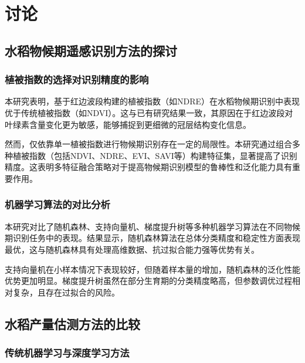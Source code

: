 
\chapter{讨论}
\label{chap:discussion}

\section{水稻物候期遥感识别方法的探讨}
\label{sec:discuss_phenology}

\subsection{植被指数的选择对识别精度的影响}
\label{subsec:vi_impact}

本研究表明，基于红边波段构建的植被指数（如NDRE）在水稻物候期识别中表现优于传统植被指数（如NDVI）。这与已有研究结果一致\cite{ref1}，其原因在于红边波段对叶绿素含量变化更为敏感，能够捕捉到更细微的冠层结构变化信息。

然而，仅依靠单一植被指数进行物候期识别存在一定的局限性。本研究通过组合多种植被指数（包括NDVI、NDRE、EVI、SAVI等）构建特征集，显著提高了识别精度。这表明多特征融合策略对于提高物候期识别模型的鲁棒性和泛化能力具有重要作用。

\subsection{机器学习算法的对比分析}
\label{subsec:ml_compare}

本研究对比了随机森林、支持向量机、梯度提升树等多种机器学习算法在不同物候期识别任务中的表现。结果显示，随机森林算法在总体分类精度和稳定性方面表现最优，这与随机森林具有处理高维数据、抗过拟合能力强等优势有关\cite{ref2}。

支持向量机在小样本情况下表现较好，但随着样本量的增加，随机森林的泛化性能优势更加明显。梯度提升树虽然在部分生育期的分类精度略高，但参数调优过程相对复杂，且存在过拟合的风险。

\section{水稻产量估测方法的比较}
\label{sec:discuss_yield}

\subsection{传统机器学习与深度学习方法}
\label{subsec:ml_vs_dl}

